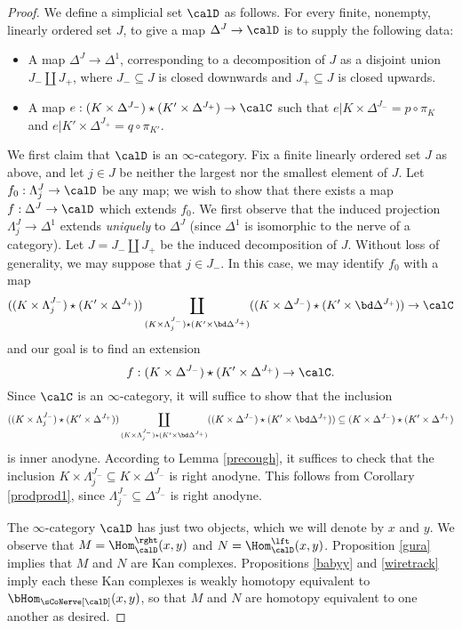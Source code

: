 \begin{proof}
We define a simplicial set $\calD$ as follows. For every finite, nonempty, linearly ordered set $J$, to give a map $\Delta^{J} \rightarrow \calD$ is to supply the following data:

\begin{itemize}
\item A map $\Delta^{J} \rightarrow \Delta^1$, corresponding to a decomposition of
$J$ as a disjoint union $J_{-} \coprod J_{+}$, where $J_{-} \subseteq J$ is closed downwards and
$J_{+} \subseteq J$ is closed upwards.

\item A map $e: (K \times \Delta^{J_{-}}) \star (K' \times
\Delta^{J_{+}}) \rightarrow \calC$ such that $e| K \times
\Delta^{J_{-}} = p \circ \pi_K$ and $e| K' \times \Delta^{J_{+}} =
q \circ \pi_{K'}$.
\end{itemize}

We first claim that $\calD$ is an $\infty$-category. Fix a finite linearly ordered set $J$ as above, and let $j \in J$ be neither the largest nor the smallest element of $J$. Let 
$f_0: \Lambda^J_{j} \rightarrow \calD$ be any map; we wish to show that there exists a map
$f: \Delta^J \rightarrow \calD$ which extends $f_0$. We first observe that the induced projection
$\Lambda^J_{j} \rightarrow \Delta^1$ extends {\em uniquely} to $\Delta^J$ (since $\Delta^1$ is isomorphic to the nerve of a category). Let $J = J_{-} \coprod J_{+}$ be the induced decomposition of $J$. Without loss of generality, we may suppose that $j \in J_{-}$. In this case, we may identify
$f_0$ with a map
$$ (( K \times \Lambda^{J_{-}}_j ) \star (K' \times \Delta^{J_+} ))
\coprod_{ (K \times \Lambda^{J_-}_j ) \star (K' \times \bd \Delta^{J_+}) }
(( K \times \Delta^{J_{-}} ) \star (K' \times \bd \Delta^{J_+})) \rightarrow 
\calC$$
and our goal is to find an extension 
$$f: ( K \times \Delta^{J_{-}} ) \star (K' \times \Delta^{J_+} ) \rightarrow \calC.$$
Since $\calC$ is an $\infty$-category, it will suffice to show that the inclusion
$$ (( K \times \Lambda^{J_{-}}_j ) \star (K' \times \Delta^{J_+} ))
\coprod_{ (K \times \Lambda^{J_-}_j ) \star (K' \times \bd \Delta^{J_+}) }
(( K \times \Delta^{J_{-}} ) \star (K' \times \bd \Delta^{J_+})) \subseteq 
 ( K \times \Delta^{J_{-}} ) \star (K' \times \Delta^{J_+} )$$ is inner anodyne.
According to Lemma \ref{precough}, it suffices to check that the inclusion $K \times \Lambda^{J_{-}}_j \subseteq K \times \Delta^{J_{-}}$ is 
right anodyne. This follows from Corollary \ref{prodprod1}, since $\Lambda^{J_{-}}_j \subseteq \Delta^{J_{-}}$ is right anodyne.

The $\infty$-category $\calD$ has just two objects, which we will denote by
$x$ and $y$. We observe that $M = \Hom^{\rght}_{\calD}(x,y)$ and $N = \Hom^{\lft}_{\calD}(x,y)$.
Proposition \ref{gura} implies that $M$ and $N$ are Kan complexes.
Propositions \ref{babyy} and \ref{wiretrack} imply each these Kan complexes is weakly homotopy equivalent to $\bHom_{ \sCoNerve[\calD]}(x,y)$, so that $M$ and $N$ are homotopy equivalent to one another as desired.
\end{proof}

